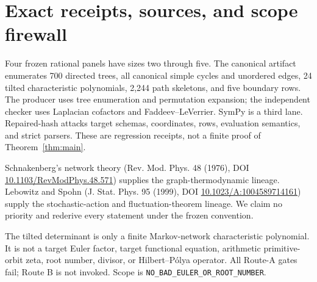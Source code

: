 \documentclass[10pt]{article}
\begin{document}
\section{Exact receipts, sources, and scope firewall}
Four frozen rational panels have sizes two through five.  The canonical artifact enumerates 700 directed trees, all canonical simple cycles and unordered edges, 24 tilted characteristic polynomials, 2,244 path skeletons, and five boundary rows.  The producer uses tree enumeration and permutation expansion; the independent checker uses Laplacian cofactors and Faddeev--LeVerrier.  SymPy is a third lane.  Repaired-hash attacks target schemas, coordinates, rows, evaluation semantics, and strict parsers.  These are regression receipts, not a finite proof of Theorem~\ref{thm:main}.

Schnakenberg's network theory (Rev. Mod. Phys. 48 (1976), DOI
\href{https://doi.org/10.1103/RevModPhys.48.571}{10.1103/RevModPhys.48.571}) supplies the graph-thermodynamic lineage.  Lebowitz and Spohn (J. Stat. Phys. 95 (1999), DOI
\href{https://doi.org/10.1023/A:1004589714161}{10.1023/A:1004589714161}) supply the stochastic-action and fluctuation-theorem lineage.  We claim no priority and rederive every statement under the frozen convention.

The tilted determinant is only a finite Markov-network characteristic polynomial.  It is not a target Euler factor, target functional equation, arithmetic primitive-orbit zeta, root number, divisor, or Hilbert--Pólya operator.  All Route-A gates fail; Route B is not invoked.  Scope is \texttt{NO\_BAD\_EULER\_OR\_ROOT\_NUMBER}.
\fi
\end{document}
